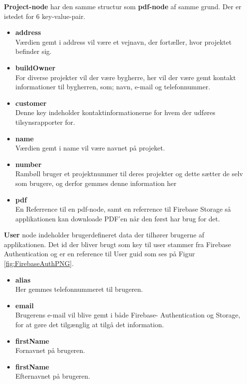 	\textbf{Project-node} har den samme structur som \textbf{pdf-node} af samme grund. Der er istedet for 6 key-value-pair. 
	\begin{itemize}
		\item  \textbf{address}\\
		Værdien gemt i address vil være et vejnavn, der fortæller, hvor projektet befinder sig.\\
		\item  \textbf{buildOwner}\\
		For diverse projekter vil der være bygherre, her vil der være gemt kontakt informationer til bygherren, som; navn, e-mail og telefonnummer. \\ 
		\item  \textbf{customer}\\
		Denne key indeholder kontaktinformationerne for hvem der udføres tilsynsrapporter for.\\
		\item  \textbf{name}\\
		Værdien gemt i name vil være navnet på projeket.\\
		\item  \textbf{number}\\
		Rambøll bruger et projektnummer til deres projekter og dette sætter de selv som brugere, og derfor gemmes denne information her\\
		\item  \textbf{pdf}\\
		En Referrence til en pdf-node, samt en referrence til Firebase Storage så applikationen kan  downloade PDF'en når den først har brug for det.\\
	\end{itemize}

\textbf{User} node indeholder brugerdefineret data der tilhører brugerne af applikationen. Det id der bliver brugt som key til user stammer fra Firebase Authentication og er en reference til User guid som ses på Figur \ref{fig:FirebaseAuthPNG}. 
\begin{itemize}
	\item \textbf{alias} \\
	Her gemmes telefonnummeret til brugeren. \\
	\item \textbf{email} \\
	Brugerens e-mail vil blive gemt i både Firebase- Authentication og Storage, for at gøre det tilgænglig at tilgå det information.\\
	\item \textbf{firstName} \\
	Fornavnet på brugeren.\\
	\item \textbf{firstName} \\
	Efternavnet på brugeren.\\

\end{itemize}

\clearpage

